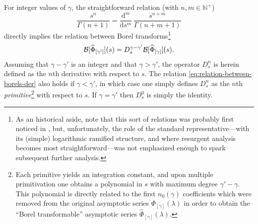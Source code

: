 \documentclass[11pt,a4paper]{article}
\newcommand{\CB}{{\cal B}}
\def\BN{{\mathbb N}}
\newcommand{\be}{\begin{equation}}
\newcommand{\ee}{\end{equation}}
\newcommand{\rmd}{{\mathrm{d}}}
\begin{document}
For integer values of $\gamma$, the straightforward relation (with $n,m \in \BN^+$)
%
\be
\frac{s^n}{\Gamma \left( n+1 \right)} = \frac{\rmd^m}{\rmd s^m}\, \frac{s^{n+m}}{\Gamma \left( n+m+1 \right)}
\ee
%
\noindent
directly implies the relation between Borel transforms\footnote{As an historical aside, note that this sort of relations was probably first noticed in \cite{bpv78b}, but, unfortunately, the role of the standard representative---with its (simple) logarithmic ramified structure, and where resurgent analysis becomes most straightforward---was not emphasized enough to spark subsequent further analysis.}
%
\be
\label{eq:relation-between-borels-der}
\CB [ \widehat{\Phi}_{[\gamma']} ] (s) = D_s^{\gamma-\gamma'} \CB [ \widehat{\Phi}_{[\gamma]} ] (s).
\ee
%
\noindent
Assuming that $\gamma-\gamma'$ is an integer and that $\gamma>\gamma'$, the operator $D_s^n$ is herein defined as the $n$th derivative with respect to $s$. The relation \eqref{eq:relation-between-borels-der} also holds if $\gamma<\gamma'$, in which case one simply defines $D_s^n$ as the $n$th \textit{primitive}\footnote{Each primitive yields an integration constant, and upon multiple primitivation one obtains a polynomial in $s$ with maximum degree $\gamma'-\gamma$. This polynomial is directly related to the first $n_0(\gamma)$ coefficients which were removed from the original asymptotic series $\Phi_{[\gamma]} (\lambda)$ in order to obtain the ``Borel transformable'' asymptotic series $\widehat{\Phi}_{[\gamma]} (\lambda)$.} with respect to $s$. If $\gamma=\gamma'$ then $D_s^0$ is simply the identity.
\end{document}
